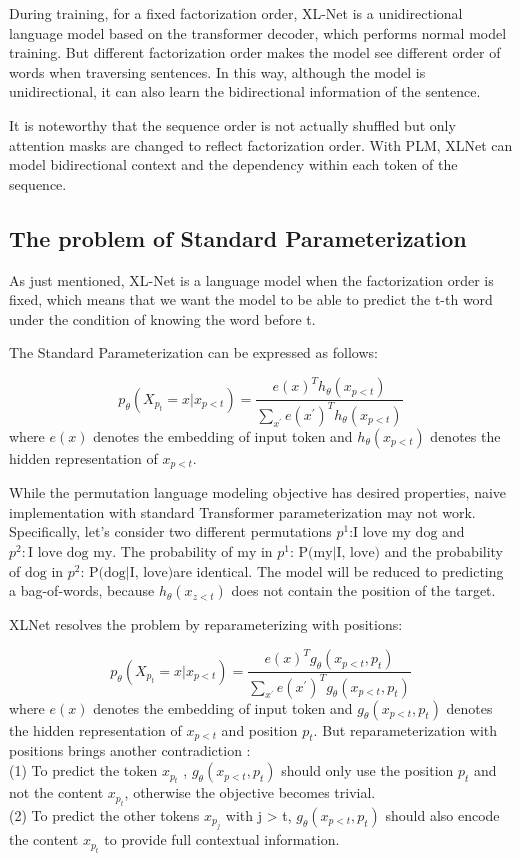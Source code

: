 \documentclass[]{krantz}
\begin{document}
During training, for a fixed factorization order, XL-Net is a unidirectional language model based on the transformer decoder, which performs normal model training. But different factorization order makes the model see different order of words when traversing sentences. In this way, although the model is unidirectional, it can also learn the bidirectional information of the sentence.

It is noteworthy that the sequence order is not actually shuffled but only attention masks are changed to reflect factorization order. With PLM, XLNet can model bidirectional context and the dependency within each token of the sequence.

\hypertarget{the-problem-of-standard-parameterization}{%
\subsection{The problem of Standard Parameterization}\label{the-problem-of-standard-parameterization}}

As just mentioned, XL-Net is a language model when the factorization order is fixed, which means that we want the model to be able to predict the t-th word under the condition of knowing the word before t.

The Standard Parameterization can be expressed as follows:

\[p_{\theta}(X_{p_t}=x|x_{p<t})=\frac{e(x)^Th_{\theta}(x_{p<t})}{\sum_{x^{'}}e(x^{'})^Th_{\theta}(x_{p<t})}\]
where \(e(x)\) denotes the embedding of input token and \(h_{\theta}(x_{p<t})\) denotes the hidden representation of \(x_{p<t}\).

While the permutation language modeling objective has desired properties, naive implementation with standard Transformer parameterization may not work. Specifically, let's consider two different permutations \(p^1\text{:{I love my dog}}\) and \(p^2:\text{{I love dog my}}\). The probability of \(\text{{my}}\) in \(p^1\): \(\text{P(my|I, love)}\) and the probability of \(\text{{dog}}\) in \(p^2\): \(\text{P(dog|I, love)}\)are identical. The model will be reduced to predicting a bag-of-words, because \(h_{\theta}(x_{z<t})\) does not contain the position of the target.

XLNet resolves the problem by reparameterizing with positions:

\[p_{\theta}(X_{p_t}=x|x_{p<t})=\frac{e(x)^Tg_{\theta}(x_{p<t},p_t)}{\sum_{x^{'}}e(x^{'})^Tg_{\theta}(x_{p<t},p_t)}\]
where \(e(x)\) denotes the embedding of input token and \(g_{\theta}(x_{p<t},p_t)\) denotes the hidden representation of \(x_{p<t}\) and position \(p_t\).
But reparameterization with positions brings another contradiction \citet{yang2019xlnet}:\\
(1) To predict the token \(x_{p_t}\) , \(g_{\theta}(x_{p<t},p_t)\) should only use the position \(p_t\) and not the content \(x_{p_t}\), otherwise the objective becomes trivial.\\
(2) To predict the other tokens \(x_{p_j}\) with j \textgreater{} t, \(g_{\theta}(x_{p<t},p_t)\) should also encode the content \(x_{p_t}\) to provide full contextual information.
\end{document}
